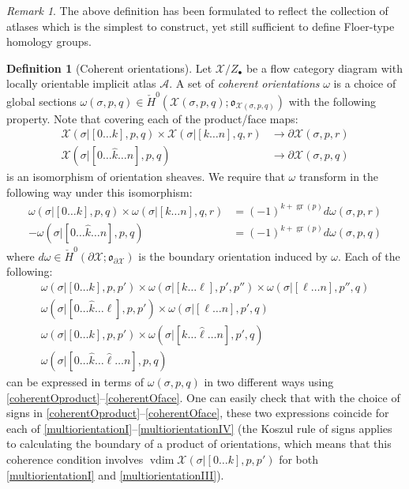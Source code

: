 \documentclass[12pt]{article}
\theoremstyle{definition}
\newtheorem{definition}[theorem]{Definition}
\theoremstyle{remark}
\newtheorem{remark}[theorem]{Remark}
\numberwithin{equation}{subsection}
\newcommand{\oo}{\mathfrak o}
\newcommand{\X}{\mathcal X}
\newcommand{\A}{\mathcal A}
\newcommand{\cH}{\check H}
\newcommand{\vdim}{\operatorname{vdim}}
\newcommand{\gr}{\operatorname{gr}}
\begin{document}
\begin{remark}
The above definition has been formulated to reflect the collection of atlases which is the simplest to construct, yet still sufficient to define Floer-type homology groups.
\end{remark}

\begin{definition}[Coherent orientations]\label{cohordefabstract}
Let $\X/Z_\bullet$ be a flow category diagram with locally orientable implicit atlas $\A$.  A set of \emph{coherent orientations} $\omega$ is a choice of global sections $\omega(\sigma,p,q)\in\cH^0(\X(\sigma,p,q);\oo_{\X(\sigma,p,q)})$ with the following property.  Note that covering each of the product/face maps:
\begin{align}
\X(\sigma|[0\ldots k],p,q)\times\X(\sigma|[k\ldots n],q,r)&\to\partial\X(\sigma,p,r)\\
\X(\sigma|[0\ldots\hat k\ldots n],p,q)&\to\partial\X(\sigma,p,q)
\end{align}
is an isomorphism of orientation sheaves.  We require that $\omega$ transform in the following way under this isomorphism:
\begin{align}
\label{coherentOproduct}\omega(\sigma|[0\ldots k],p,q)\times\omega(\sigma|[k\ldots n],q,r)&=(-1)^{k+\gr(p)}d\omega(\sigma,p,r)\\
\label{coherentOface}-\omega(\sigma|[0\ldots\hat k\ldots n],p,q)&=(-1)^{k+\gr(p)}d\omega(\sigma,p,q)
\end{align}
where $d\omega\in\cH^0(\partial\X;\oo_{\partial\X})$ is the boundary orientation induced by $\omega$.  Each of the following:
\begin{gather}
\label{multiorientationI}\omega(\sigma|[0\ldots k],p,p')\times\omega(\sigma|[k\ldots\ell],p',p'')\times\omega(\sigma|[\ell\ldots n],p'',q)\\
\label{multiorientationII}\omega(\sigma|[0\ldots\hat k\ldots\ell],p,p')\times\omega(\sigma|[\ell\ldots n],p',q)\\
\label{multiorientationIII}\omega(\sigma|[0\ldots k],p,p')\times\omega(\sigma|[k\ldots\hat\ell\ldots n],p',q)\\
\label{multiorientationIV}\omega(\sigma|[0\ldots\hat k\ldots\hat\ell\ldots n],p,q)
\end{gather}
can be expressed in terms of $\omega(\sigma,p,q)$ in two different ways using \eqref{coherentOproduct}--\eqref{coherentOface}.  One can easily check that with the choice of signs in \eqref{coherentOproduct}--\eqref{coherentOface}, these two expressions coincide for each of \eqref{multiorientationI}--\eqref{multiorientationIV} (the Koszul rule of signs applies to calculating the boundary of a product of orientations, which means that this coherence condition involves $\vdim\X(\sigma|[0\ldots k],p,p')$ for both \eqref{multiorientationI} and \eqref{multiorientationIII}).


\end{definition}
\end{document}
